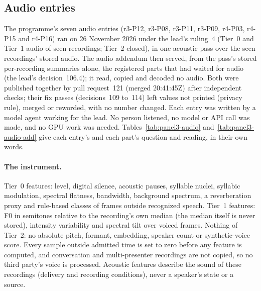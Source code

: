 \clearpage\clearpage

\subsection{Audio entries}
\label{app:panel3-audio}

The programme's seven audio entries (r3-P12, r3-P08, r3-P11, r3-P09, r4-P03, r4-P15 and r4-P16) ran on 26 November 2026
under the lead's ruling~4 (Tier~0 and Tier~1 audio of seen recordings; Tier~2 closed), in one acoustic pass over the seen
recordings' stored audio. The audio addendum then served, from the pass's stored per-recording summaries alone, the
registered parts that had waited for audio (the lead's decision~106.4); it read, copied and decoded no audio. Both were
published together by pull request~121 (merged 20:41:45Z) after independent checks; their fix passes (decisions~109
to~114) left values not printed (privacy rule), merged or reworded, with no number changed. Each entry was written by a
model agent working for the lead. No person listened, no model or API call was made, and no GPU work was needed.
Tables~\ref{tab:panel3-audio} and~\ref{tab:panel3-audio-add} give each entry's and each part's question and reading, in
their own words.

\paragraph{The instrument.} Tier~0 features: level, digital silence, acoustic pauses, syllable nuclei, syllabic
modulation, spectral flatness, bandwidth, background spectrum, a reverberation proxy and rule-based classes of frames
outside recognized speech. Tier~1 features: F0 in semitones relative to the recording's own median (the median itself is
never stored), intensity variability and spectral tilt over voiced frames. Nothing of Tier~2: no absolute pitch, formant,
embedding, speaker count or synthetic-voice score. Every sample outside admitted time is set to zero before any feature is
computed, and conversation and multi-presenter recordings are not copied, so no third party's voice is processed.
Acoustic features describe the sound of these recordings (delivery and recording conditions), never a speaker's state or
a source.

